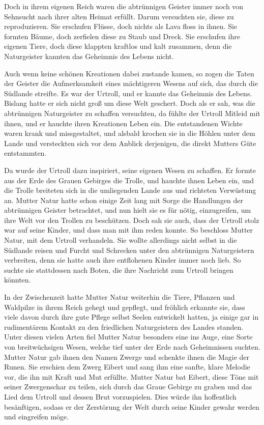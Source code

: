 Doch in ihrem eigenen Reich waren die abtrünnigen Geister immer noch von Sehnsucht nach ihrer alten Heimat erfüllt. Darum versuchten sie, diese zu reproduzieren. Sie erschufen Flüsse, doch nichts als Lava floss in ihnen. Sie formten Bäume, doch zerfielen diese zu Staub und Dreck. Sie erschufen ihre eigenen Tiere, doch diese klappten kraftlos und kalt zusammen, denn die Naturgeister kannten das Geheimnis des Lebens nicht.

Auch wenn keine schönen Kreationen dabei zustande kamen, so zogen die Taten der Geister die Aufmerksamkeit eines mächtigeren Wesens auf sich, das durch die Südlande streifte. Es war der Urtroll, und er kannte das Geheimnis des Lebens. Bislang hatte er sich nicht groß um diese Welt geschert. Doch als er sah, was die abtrünnigen Naturgeister zu schaffen versuchten, da fühlte der Urtroll Mitleid mit ihnen, und er hauchte ihren Kreationen Leben ein. Die entstandenen Wichte waren krank und missgestaltet, und alsbald krochen sie in die Höhlen unter dem Lande und versteckten sich vor dem Anblick derjenigen, die direkt Mutters Güte entstammten.

Da wurde der Urtroll dazu inspiriert, seine eigenen Wesen zu schaffen. Er formte aus der Erde des Grauen Gebirges die Trolle, und hauchte ihnen Leben ein, und die Trolle breiteten sich in die umliegenden Lande aus und richteten Verwüstung an. Mutter Natur hatte schon einige Zeit lang mit Sorge die Handlungen der abtrünnigen Geister betrachtet, und nun hielt sie es für nötig, einzugreifen, um ihre Welt vor den Trollen zu beschützen. Doch sah sie auch, dass der Urtroll stolz war auf seine Kinder, und dass man mit ihm reden konnte. So beschloss Mutter Natur, mit dem Urtroll verhandeln. Sie wollte allerdings nicht selbst in die Südlande reisen und Furcht und Schrecken unter den abtrünnigen Naturgeistern verbreiten, denn sie hatte auch ihre entflohenen Kinder immer noch lieb. So suchte sie stattdessen nach Boten, die ihre Nachricht zum Urtroll bringen könnten.

In der Zwischenzeit hatte Mutter Natur weiterhin die Tiere, Pflanzen und Waldpilze in ihrem Reich gehegt und gepflegt, und fröhlich erkannte sie, dass viele davon durch ihre gute Pflege selbst Seelen entwickelt hatten, ja einige gar in rudimentärem Kontakt zu den friedlichen Naturgeistern des Landes standen. Unter diesen vielen Arten fiel Mutter Natur besonders eine ins Auge, eine Sorte von breitwüchsigen Wesen, welche tief unter der Erde nach Geheimnissen suchten. Mutter Natur gab ihnen den Namen Zwerge und schenkte ihnen die Magie der Runen. Sie erschien dem Zwerg Eibert und sang ihm eine sanfte, klare Melodie vor, die ihn mit Kraft und Mut erfüllte. Mutter Natur bat Eibert, diese Töne mit seiner Zwergenschar zu teilen, sich durch das Graue Gebirge zu graben und das Lied dem Urtroll und dessen Brut vorzuspielen. Dies würde ihn hoffentlich besänftigen, sodass er der Zerstörung der Welt durch seine Kinder gewahr werden und eingreifen möge.

